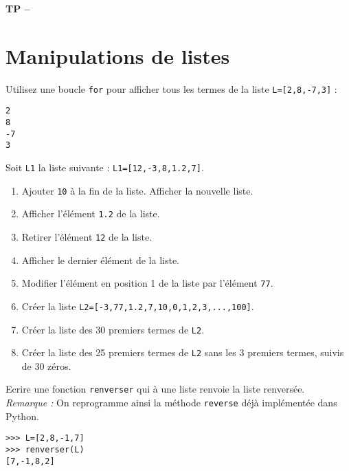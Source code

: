 






\begin{center}
{\Large\bf TP \no {\num} -- \descrip}
\end{center}




\section{Manipulations de listes}


\begin{exercice}
Utilisez une boucle \verb?for? pour afficher tous les termes de la liste \verb?L=[2,8,-7,3]? :
\begin{verbatim}
2
8
-7
3
\end{verbatim}
\end{exercice}


\begin{exercice}
Soit \verb?L1? la liste suivante : \verb?L1=[12,-3,8,1.2,7]?.
\begin{enumerate}
\item Ajouter \verb?10? \` a la fin de la liste. Afficher la nouvelle liste.
\item Afficher l'\' el\' ement \verb?1.2? de la liste.
\item Retirer l'\' el\' ement \verb?12? de la liste. 
\item Afficher le dernier \' el\' ement de la liste.
\item Modifier l'\' el\' ement en position 1 de la liste par l'\' el\' ement \verb?77?.
\item Cr\' eer la liste \verb?L2=[-3,77,1.2,7,10,0,1,2,3,...,100]?.
\item Cr\' eer la liste des 30 premiers termes de \verb?L2?.
\item Cr\' eer la liste des 25 premiers termes de \verb?L2? sans les 3 premiers termes, suivis de 30 z\' eros.
\end{enumerate}
\end{exercice}

\begin{exercice}
Ecrire une fonction \verb?renverser? qui \` a une liste renvoie la liste renvers\' ee.\\
\textit{Remarque : }On reprogramme ainsi la m\' ethode \verb?reverse? d\' ej\` a impl\' ement\' ee dans Python.
\begin{verbatim}
>>> L=[2,8,-1,7]
>>> renverser(L)
[7,-1,8,2]
\end{verbatim}
\end{exercice}



